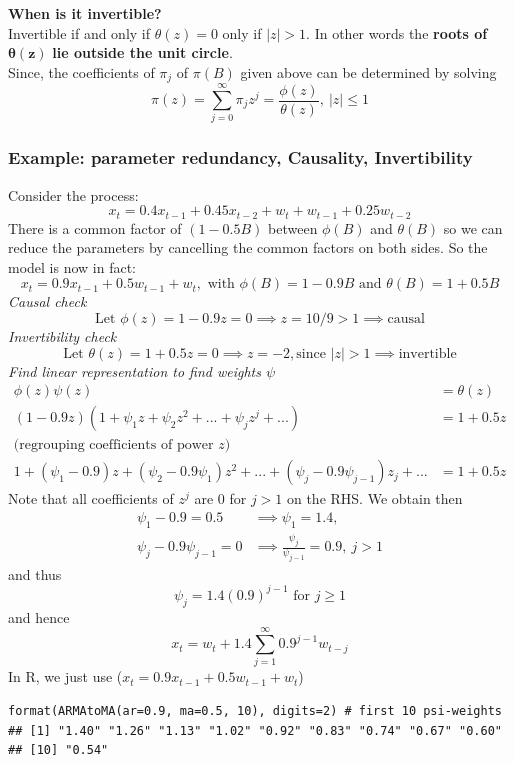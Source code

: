 \documentclass[11pt]{article}
\newcommand{\noi}{\noindent}
\begin{document}
\noi \textbf{When is it invertible?} \\
\noi Invertible if and only if $\theta(z) = 0$ only if $|z| > 1$. In other words the \textbf{roots of} $\boldsymbol{\theta(z)}$ \textbf{lie outside the unit circle}. \\

\noi Since, the coefficients of $\pi_j$ of $\pi(B)$ given above can be determined by solving
$$\pi(z) = \sum_{j=0}^{\infty}{\pi_jz^j} = \frac{\phi(z)}{\theta(z)}, \: |z| \leq 1$$

\subsubsection*{Example: parameter redundancy, Causality, Invertibility}
\noi Consider the process:
$$x_t = 0.4x_{t-1} + 0.45x_{t-2} + w_t + w_{t-1} + 0.25w_{t-2}$$
\noi There is a common factor of $(1-0.5B)$ between $\phi(B)$ and $\theta(B)$ so we can reduce the parameters by cancelling the common factors on both sides. So the model is now in fact:
$$x_t = 0.9x_{t-1} + 0.5w_{t-1} + w_t, \text{ with } \phi(B) = 1-0.9B \text{ and } \theta(B) = 1 + 0.5B$$
\noi \textit{Causal check}
$$\text{Let } \phi(z) = 1-0.9z = 0 \implies z = 10/9 > 1 \implies \text{causal}$$
\noi \textit{Invertibility check}
$$\text{Let } \theta(z) = 1 + 0.5z = 0 \implies z = -2, \text{since } |z|>1 \implies \text{invertible}$$
\noi \textit{Find linear representation to find weights $\psi$}
\begin{align*}
    \phi(z)\psi(z) &= \theta(z) \\
    (1-0.9z)(1 + \psi_1z + \psi_2z^2 + ... + \psi_jz^j + ...) &=  1 + 0.5z \\
    \text{(regrouping coefficients of power $z$)}& \\
    1 + (\psi_1 - 0.9)z + (\psi_2 - 0.9\psi_1)z^2 + ... + (\psi_j - 0.9\psi_{j-1})z_j + ... &= 1 + 0.5z
\end{align*}
\noi Note that all coefficients of $z^j$ are $0$ for $j > 1$ on the RHS. We obtain then
\begin{align*}
    \psi_1 - 0.9 = 0.5 &\implies \psi_1 = 1.4, \\
    \psi_j - 0.9\psi_{j-1} = 0 &\implies \frac{\psi_j}{\psi_{j-1}} = 0.9, \: j >1
\end{align*}
\noi and thus
$$\psi_j = 1.4(0.9)^{j-1} \text{ for } j \geq 1$$
\noi and hence
$$x_t = w_t + 1.4\sum_{j=1}^{\infty}0.9^{j-1}w_{t-j}$$
\noi In R, we just use ($x_t = 0.9x_{t-1} + 0.5w_{t-1} + w_t$)
\begin{lstlisting}
format(ARMAtoMA(ar=0.9, ma=0.5, 10), digits=2) # first 10 psi-weights
## [1] "1.40" "1.26" "1.13" "1.02" "0.92" "0.83" "0.74" "0.67" "0.60"
## [10] "0.54"
\end{lstlisting}
\end{document}
